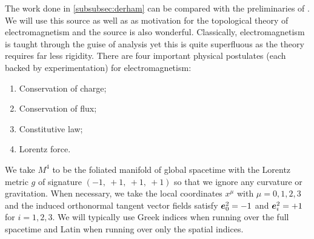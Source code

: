 \documentclass{article}
\begin{document}
The work done in \cref{subsubsec:derham} can be compared with the preliminaries of \cite{delphenich_axioms_2005}. We will use this source as well as \cite{hehl_introduction_2003} as motivation for the topological theory of electromagnetism and the source \cite{gross_electromagnetic_2004} is also wonderful. Classically, electromagnetism is taught through the guise of analysis yet this is quite superfluous as the theory requires far less rigidity. There are four important physical postulates (each backed by experimentation) for electromagnetism:
\begin{enumerate}
    \item Conservation of charge;
    \item Conservation of flux;
    \item Constitutive law;
    \item Lorentz force.
\end{enumerate}
We take $M^4$ to be the foliated manifold of global spacetime with the Lorentz metric $g$ of signature $(-1, ~+1,~+1,~+1)$ so that we ignore any curvature or gravitation. When necessary, we take the local coordinates $x^\mu$ with $\mu=0,1,2,3$ and the induced orthonormal tangent vector fields satisfy $\boldsymbol{e}_0^2 = -1$ and $\boldsymbol{e}_i^2=+1$ for $i=1,2,3$. We will typically use Greek indices when running over the full spacetime and Latin when running over only the spatial indices.
\end{document}
